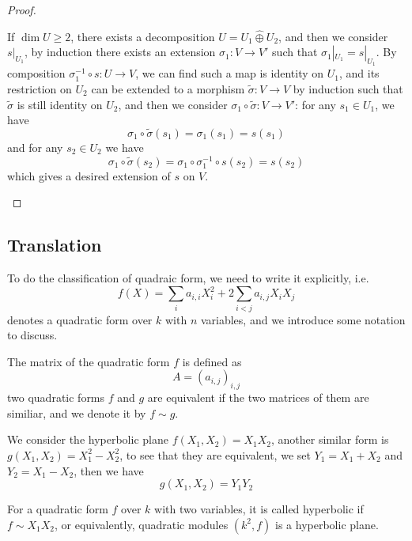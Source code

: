\begin{proof}
\begin{itemize}[label=$\blacktriangleright$]
    If \(\dim U \geq 2\), there exists a decomposition \(U = U_1 \hat{\oplus} U_2\), and then we consider \(s|_{U_1}\), by induction there exists an extension \(\sigma_1: V  \to V'\) such that \(\sigma_1|_{U_1} = s|_{U_1}\). By composition \(\sigma_1^{-1}\circ s : U \to V\), we can find such a map is identity on \(U_1\), and its restriction on \(U_2\) can be extended to a morphism \(\tilde{\sigma}: V \to V\) by induction such that \(\tilde{\sigma}\) is still identity on \(U_2\), and then we consider \(\sigma_1 \circ \tilde{\sigma} : V \to V'\): for any \(s_1 \in U_1\), we have 
    \[\sigma_1 \circ \tilde{\sigma} (s_1) = \sigma_1(s_1) = s(s_1)\]
    and for any \(s_2 \in U_2\) we have
    \[\sigma_1 \circ \tilde{\sigma} (s_2) = \sigma_1 \circ \sigma_1^{-1} \circ s(s_2) = s(s_2) \]
    which gives a desired extension of \(s\) on \(V\).
      \end{itemize}
\end{proof}

\subsection{Translation}

To do the classification of quadraic form, we need to write it explicitly, i.e. 
\[f(X) = \sum_{i} a_{i,i}X_i^2+ 2\sum_{i < j} a_{i,j}X_iX_j\]
denotes a quadratic form over \(k\) with \(n\) variables, and we introduce some notation to discuss.

\begin{definition}
    The matrix of the quadratic form \(f\) is defined as 
    \[A = (a_{i,j})_{i,j}\]
    two quadratic forms \(f\) and \(g\) are equivalent if the two matrices of them are similiar, and we denote it by \(f \sim g\).
\end{definition}

\begin{remark}
    We consider the hyperbolic plane \(f(X_1,X_2) = X_1X_2\), another similar form is \(g(X_1,X_2) = X_1^2 - X_2^2\), to see that they are equivalent, we set \(Y_1 = X_1+X_2\) and \(Y_2 = X_1 - X_2\), then we have
    \[g(X_1,X_2) = Y_1Y_2\]
\end{remark}

\begin{definition}
    For a quadratic form \(f\) over \(k\) with two variables, it is called hyperbolic if \(f \sim X_1X_2\), or equivalently, quadratic modules \((k^2,f)\) is a hyperbolic plane.
\end{definition}

